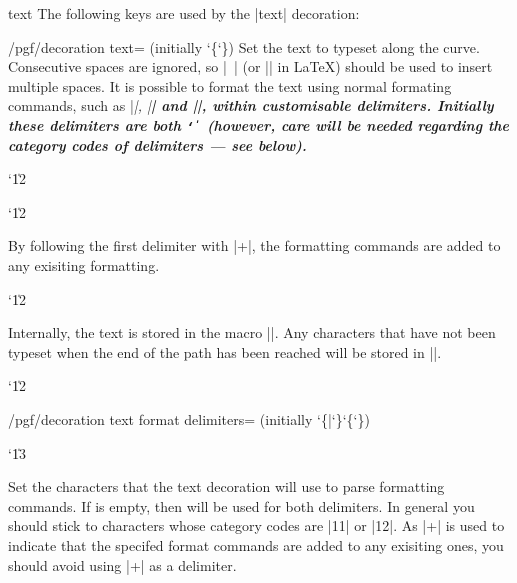 \begin{decoration}{text}
	The following keys are used by the |text| decoration:
	
	\begin{key}{/pgf/decoration text= (initially \char`\{\char`\})}
	Set the text to typeset along the curve. 
	Consecutive spaces are ignored, so |\ | (or |\space| in \LaTeX) 
	should be used to insert multiple spaces.	It is possible to
	format the text using normal formating commands, such as |\it|, |\bf|
	and |\color|, within customisable delimiters. Initially these
	delimiters are both {\tt\char`\|} (however, care will be needed 
	regarding	the category codes of delimiters --- see below). 

{\catcode`\|12
\begin{codeexample}[]
\catcode`\|12
\end{codeexample}
}
By following the first delimiter
	with |+|, the formatting commands are added to any exisiting 
	formatting.

{\catcode`\|12
\begin{codeexample}[]
\end{codeexample}
}
	
Internally, the text is stored in the macro |\pgfdecorationtext|. 
Any characters that have not been typeset when the end of the 
path has been reached will be stored in |\pgfdecorationrestoftext|.

\end{key}

{\catcode`\|12
\begin{key}{/pgf/decoration text format delimiters= (initially \char`\{|\char`\}\char`\{\char`\})}

	\catcode`\|13
	
	Set the characters that the text decoration will use to parse 
	formatting commands. 
	If  is empty, then  will be used for both
	delimiters.
	In general you should stick to characters	whose category codes are 
	|11| or |12|.
	As |+| is used to indicate that the specifed format commands 
	are added	to any exisiting ones, you should avoid using |+| as
	a delimiter. 


\end{key}}
\end{decoration}
